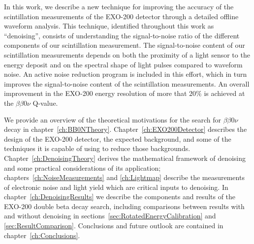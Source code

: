 In this work, we describe a new technique for improving the accuracy of the scintillation measurements of the EXO-200 detector through a detailed offline waveform analysis.  This technique, identified throughout this work as ``denoising'', consists of understanding the signal-to-noise ratio of the different components of our scintillation measurement.  The signal-to-noise content of our scintillation measurements depends on both the proximity of a light sensor to the energy deposit and on the spectral shape of light pulses compared to waveform noise.  An active noise reduction program is included in this effort, which in turn improves the signal-to-noise content of the scintillation measurements.  An overall improvement in the EXO-200 energy resolution of more that $20\%$ is achieved at the $\beta\beta 0\nu$ Q-value.

We provide an overview of the theoretical motivations for the search for $\beta\beta 0\nu$ decay in chapter~\ref{ch:BB0NTheory}.  Chapter~\ref{ch:EXO200Detector} describes the design of the EXO-200 detector, the expected background, and some of the techniques it is capable of using to reduce those backgrounds.  Chapter~\ref{ch:DenoisingTheory} derives the mathematical framework of denoising and some practical considerations of its application; chapters~\ref{ch:NoiseMeasurements} and \ref{ch:Lightmap} describe the measurements of electronic noise and light yield which are critical inputs to denoising.  In chapter~\ref{ch:DenoisingResults} we describe the components and results of the EXO-200 double beta decay search, including comparisons between results with and without denoising in sections~\ref{sec:RotatedEnergyCalibration} and \ref{sec:ResultComparison}.  Conclusions and future outlook are contained in chapter~\ref{ch:Conclusions}.
